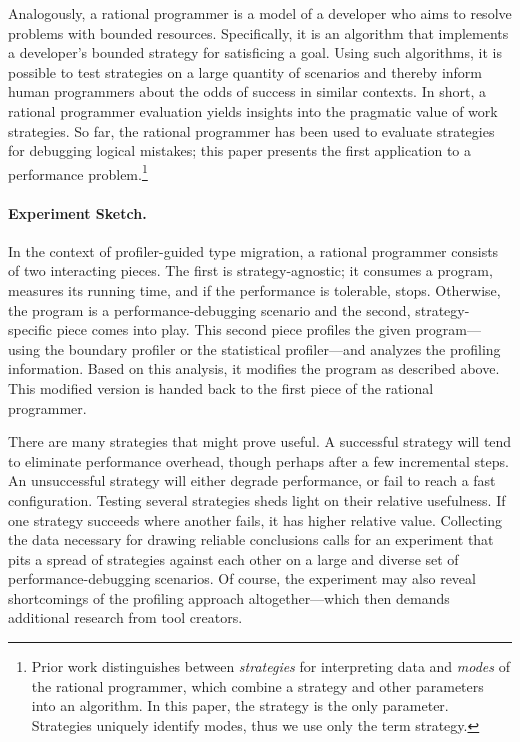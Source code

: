 Analogously, a rational programmer is a model of a developer who aims to
resolve problems with bounded resources.
Specifically, it is an algorithm that implements a developer's bounded
strategy for {satisficing} a goal. Using such algorithms, it is
possible to test strategies on a large quantity
of scenarios and thereby inform 
human programmers about the odds of success in similar contexts.
In short, a
rational programmer evaluation yields insights into the pragmatic value of
work strategies.
So far, the rational programmer has been used to evaluate
strategies for debugging logical mistakes; this paper presents the first
application to a performance problem.\footnote{Prior work
distinguishes between \emph{strategies} for interpreting data and
\emph{modes} of the rational programmer, which combine a strategy and other
parameters into an algorithm. In this paper, the strategy is the only
parameter. Strategies uniquely identify modes, thus we use only the term
strategy.}

\paragraph{Experiment Sketch.}
In the context of profiler-guided
type migration, a rational programmer consists of two interacting pieces.  The
first is strategy-agnostic; it consumes a program, measures its running time,
and if the performance is tolerable, stops. Otherwise, the program is a
performance-debugging scenario and the second,
strategy-specific piece comes into play. This second piece profiles the given program---using
the boundary profiler or the statistical profiler---and analyzes the
profiling information. Based on this analysis, it modifies the program
as described above.
This modified version is handed back
to the first piece of the rational programmer.

There are many strategies that might prove useful.
A successful strategy will tend to eliminate performance overhead,
though perhaps after a few incremental steps.
An unsuccessful strategy will either degrade performance, or fail
to reach a fast configuration.
Testing several strategies sheds light on their relative usefulness.
If one strategy succeeds where another fails, it has higher relative value.
Collecting the data necessary for drawing reliable conclusions calls for
an experiment that pits a spread of strategies against each other on a
large and diverse set of performance-debugging scenarios. Of course, the
experiment may also reveal shortcomings of the profiling approach
altogether---which then demands additional research from tool creators.

